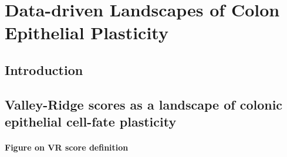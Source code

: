 \chapter{Data-driven Landscapes of Colon Epithelial Plasticity}
\label{05vr}

\section{Introduction}



\section{Valley-Ridge scores as a landscape of colonic epithelial cell-fate plasticity}



\subsubsection{Figure on VR score definition}

